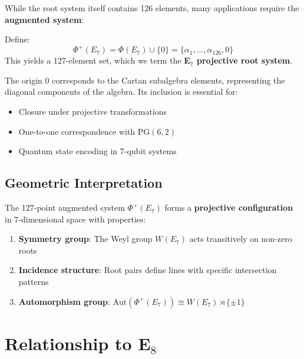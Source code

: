 While the root system itself contains 126 elements, many applications require the \textbf{augmented system}:

\begin{definition}
\label{def:e7_augmented}
Define:
\begin{equation}
\Phi^+(E_7) = \Phi(E_7) \cup \{0\} = \{\alpha_1, \ldots, \alpha_{126}, 0\}
\end{equation}
This yields a 127-element set, which we term the \textbf{E$_7$ projective root system}.
\end{definition}

\begin{remark}
The origin $0$ corresponds to the Cartan subalgebra elements, representing the diagonal components of the algebra. Its inclusion is essential for:
\begin{itemize}
    \item Closure under projective transformations
    \item One-to-one correspondence with PG$(6,2)$
    \item Quantum state encoding in 7-qubit systems
\end{itemize}
\end{remark}

\subsection{Geometric Interpretation}

\begin{theorem}
\label{thm:e7_projective}
The 127-point augmented system $\Phi^+(E_7)$ forms a \textbf{projective configuration} in 7-dimensional space with properties:
\begin{enumerate}
    \item \textbf{Symmetry group}: The Weyl group $W(E_7)$ acts transitively on non-zero roots
    \item \textbf{Incidence structure}: Root pairs define lines with specific intersection patterns
    \item \textbf{Automorphism group}: $\text{Aut}(\Phi^+(E_7)) \cong W(E_7) \rtimes \{\pm 1\}$
\end{enumerate}
\end{theorem}

\section{Relationship to E$_8$}

